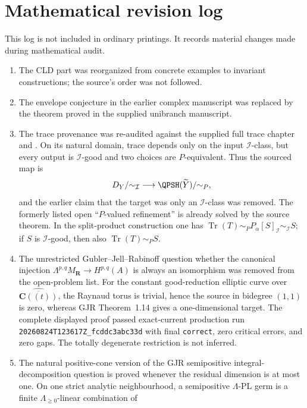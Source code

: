 \chapter*{Mathematical revision log}

This log is not included in ordinary printings.  It records material changes
made during mathematical audit.

\begin{enumerate}
\item The CLD part was reorganized from concrete examples to invariant
  constructions; the source's order was not followed.
\item The envelope conjecture in the earlier complex manuscript was replaced
  by the theorem proved in the supplied unibranch manuscript.
\item The trace provenance was re-audited against the supplied full trace
  chapter and \cite{DX24}.  On its natural domain, trace depends only on the
  input \(\mathcal I\)-class, but every output is \(\mathcal I\)-good and
  two choices are \(P\)-equivalent.  Thus the sourced map is
  \[
   D_Y/{\sim_{\mathcal I}}
   \longrightarrow
   \QPSH(\widetilde Y)/{\sim_P},
  \]
  and the earlier claim that the target was only an
  \(\mathcal I\)-class was removed.  The formerly listed open
  ``\(P\)-valued refinement'' is already solved by the source theorem.  In
  the split-product construction one has
  \(\operatorname{Tr}(T)\sim_P P_\alpha[S]_{\mathcal I}
  \sim_{\mathcal I}S\); if \(S\) is \(\mathcal I\)-good, then also
  \(\operatorname{Tr}(T)\sim_P S\).
\item The unrestricted Gubler--Jell--Rabinoff question whether the canonical
  injection
  \(\Lambda^{p,q}M_{\mathbf R}\to H^{p,q}(A)\) is always an isomorphism was
  removed from the open-problem list.  For the constant good-reduction
  elliptic curve over \(\widehat{\overline{\mathbf C((t))}}\), the Raynaud
  torus is trivial, hence the source in bidegree \((1,1)\) is zero, whereas
  GJR Theorem~1.14 gives a one-dimensional target.  The complete displayed
  proof passed exact-current production run
  \texttt{20260824T123617Z\_fcddc3abc33d} with final \texttt{correct}, zero
  critical errors, and zero gaps.  The totally degenerate restriction is not
  inferred.
\item The natural positive-cone version of the GJR semipositive
  integral-decomposition question is proved whenever the residual dimension
  is at most one.  On one strict analytic neighbourhood, a semipositive
  \(\Lambda\)-PL germ is a finite \(\Lambda_{\geq0}\)-linear combination of

\end{enumerate}
